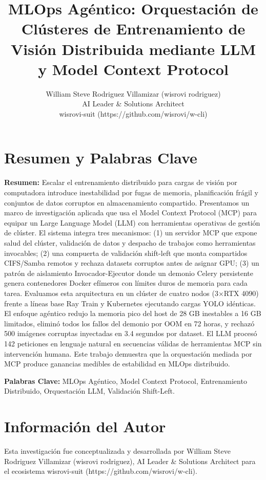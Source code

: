 \documentclass[10pt,twocolumn,letterpaper]{article}
\title{MLOps Agéntico: Orquestación de Clústeres de Entrenamiento de Visión Distribuida mediante LLM y Model Context Protocol}
\author{William Steve Rodriguez Villamizar (wisrovi rodriguez)\\AI Leader \& Solutions Architect\\wisrovi-suit (https://github.com/wisrovi/w-cli)}
\date{}
\begin{document}
\maketitle

\section{Resumen y Palabras Clave}
\textbf{Resumen:} Escalar el entrenamiento distribuido para cargas de visión por computadora introduce inestabilidad por fugas de memoria, planificación frágil y conjuntos de datos corruptos en almacenamiento compartido. Presentamos un marco de investigación aplicada que usa el Model Context Protocol (MCP) para equipar un Large Language Model (LLM) con herramientas operativas de gestión de clúster. El sistema integra tres mecanismos: (1) un servidor MCP que expone salud del clúster, validación de datos y despacho de trabajos como herramientas invocables; (2) una compuerta de validación shift-left que monta compartidos CIFS/Samba remotos y rechaza datasets corruptos antes de asignar GPU; (3) un patrón de aislamiento Invocador-Ejecutor donde un demonio Celery persistente genera contenedores Docker efímeros con límites duros de memoria para cada tarea. Evaluamos esta arquitectura en un clúster de cuatro nodos (3×RTX 4090) frente a líneas base Ray Train y Kubernetes ejecutando cargas YOLO idénticas. El enfoque agéntico redujo la memoria pico del host de 28 GB inestables a 16 GB limitados, eliminó todos los fallos del demonio por OOM en 72 horas, y rechazó 500 imágenes corruptas inyectadas en 3.4 segundos por dataset. El LLM procesó 142 peticiones en lenguaje natural en secuencias válidas de herramientas MCP sin intervención humana. Este trabajo demuestra que la orquestación mediada por MCP produce ganancias medibles de estabilidad en MLOps distribuido.

\textbf{Palabras Clave:} MLOps Agéntico, Model Context Protocol, Entrenamiento Distribuido, Orquestación LLM, Validación Shift-Left.

\section{Información del Autor}
Esta investigación fue conceptualizada y desarrollada por William Steve Rodriguez Villamizar (wisrovi rodriguez), AI Leader \& Solutions Architect para el ecosistema wisrovi-suit (https://github.com/wisrovi/w-cli).
\end{document}
